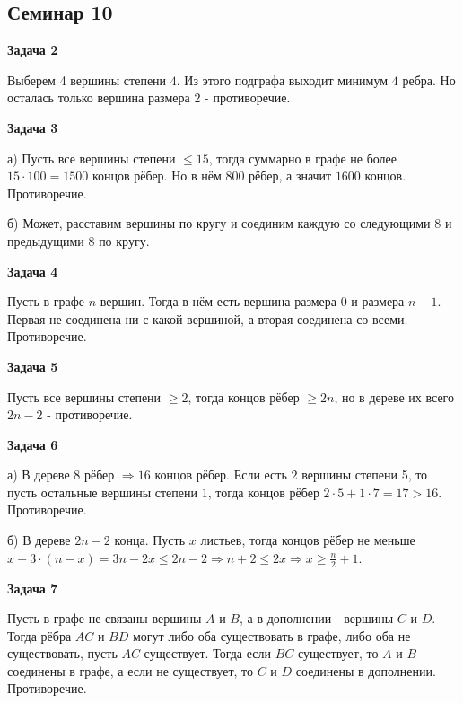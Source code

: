 \subsection{Семинар 10}
\begin{center}
\textbf{Задача 2}
\end{center}
Выберем 4 вершины степени $\displaystyle 4$. Из этого подграфа выходит минимум $\displaystyle 4$ ребра. Но осталась только вершина размера $\displaystyle 2$ - противоречие.

\begin{center}
\textbf{Задача 3}
\end{center}
а) Пусть все вершины степени $\displaystyle \leqslant 15$, тогда суммарно в графе не более $\displaystyle 15\cdotp 100=1500$ концов рёбер. Но в нём $\displaystyle 800$ рёбер, а значит $\displaystyle 1600$ концов. Противоречие.

б) Может, расставим вершины по кругу и соединим каждую со следующими $\displaystyle 8$ и предыдущими $\displaystyle 8$ по кругу.

\begin{center}
\textbf{Задача 4}
\end{center}
Пусть в графе $\displaystyle n$ вершин. Тогда в нём есть вершина размера $\displaystyle 0$ и размера $\displaystyle n-1$. Первая не соединена ни с какой вершиной, а вторая соединена со всеми. Противоречие.

\begin{center}
\textbf{Задача 5}
\end{center}
Пусть все вершины степени $\displaystyle \geqslant 2$, тогда концов рёбер $\displaystyle \geqslant 2n$, но в дереве их всего $\displaystyle 2n-2$ - противоречие.
\begin{center}
\textbf{Задача 6}
\end{center}
а) В дереве $\displaystyle 8$ рёбер $\displaystyle \Longrightarrow 16$ концов рёбер. Если есть $\displaystyle 2$ вершины степени 5, то пусть остальные вершины степени $\displaystyle 1$, тогда концов рёбер $\displaystyle 2\cdotp 5+1\cdotp 7=17 >16$. Противоречие.

б) В дереве $\displaystyle 2n-2$ конца. Пусть $\displaystyle x$ листьев, тогда концов рёбер не меньше $\displaystyle x+3\cdotp ( n-x) =3n-2x\leqslant 2n-2\Longrightarrow n+2\leqslant 2x\Longrightarrow x\geqslant \frac{n}{2} +1$.

\begin{center}
\textbf{Задача 7}
\end{center}
Пусть в графе не связаны вершины $\displaystyle A$ и $\displaystyle B$, а в дополнении - вершины $\displaystyle C$ и $\displaystyle D$. Тогда рёбра $\displaystyle AC$ и $\displaystyle BD$ могут либо оба существовать в графе, либо оба не существовать, пусть $\displaystyle AC$ существует. Тогда если $\displaystyle BC$ существует, то $\displaystyle A$ и $\displaystyle B$ соединены в графе, а если не существует, то $\displaystyle C$ и $\displaystyle D$ соединены в дополнении. Противоречие.

